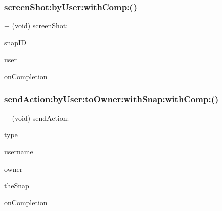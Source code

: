 \hypertarget{interface_post_abacb3cb0c44c2b28e1db7ab94ddf8666}{}\label{interface_post_abacb3cb0c44c2b28e1db7ab94ddf8666} 
\subsubsection{\texorpdfstring{screen\+Shot\+:by\+User\+:with\+Comp\+:()}{screenShot:byUser:withComp:()}}
{\footnotesize\ttfamily + (void) screen\+Shot\+: \begin{DoxyParamCaption}\item[{(N\+S\+String $\ast$)}]{snap\+ID }\item[{byUser:(N\+S\+String $\ast$)}]{user }\item[{withComp:(void($^\wedge$)(B\+O\+OL, id))}]{on\+Completion }\end{DoxyParamCaption}}

\hypertarget{interface_post_a24f3ff95284694a61b70a46e3c257ac7}{}\label{interface_post_a24f3ff95284694a61b70a46e3c257ac7} 
\subsubsection{\texorpdfstring{send\+Action\+:by\+User\+:to\+Owner\+:with\+Snap\+:with\+Comp\+:()}{sendAction:byUser:toOwner:withSnap:withComp:()}}
{\footnotesize\ttfamily + (void) send\+Action\+: \begin{DoxyParamCaption}\item[{(int)}]{type }\item[{byUser:(N\+S\+String $\ast$)}]{username }\item[{toOwner:(N\+S\+String $\ast$)}]{owner }\item[{withSnap:(\hyperlink{interface_snap}{Snap} $\ast$)}]{the\+Snap }\item[{withComp:(void($^\wedge$)(B\+O\+OL, id))}]{on\+Completion }\end{DoxyParamCaption}}

\hypertarget{interface_post_a057b7fe5bde8898cfd5384d103fa223e}{}\label{interface_post_a057b7fe5bde8898cfd5384d103fa223e} 
